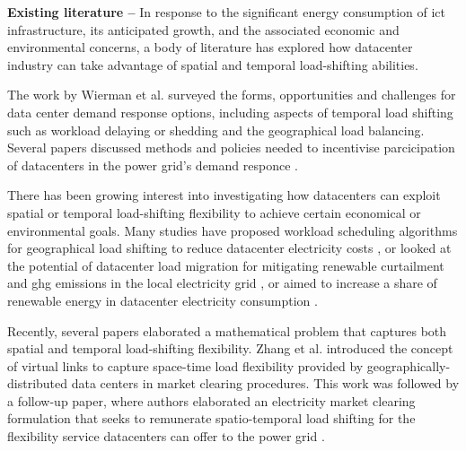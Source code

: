 \textbf{Existing literature --} In response to the significant energy consumption of \gls{ict} infrastructure, its anticipated growth, and the associated economic and environmental concerns, a body of literature has explored how datacenter industry can take advantage of spatial and temporal load-shifting abilities.

The work by Wierman et al.  \cite{wiermanOpportunitiesChallengesData2014} surveyed the forms, opportunities and challenges for data center demand response options, including aspects of temporal load shifting such as workload delaying or shedding and the geographical load balancing. Several papers discussed methods and policies needed to incentivise parcicipation of datacenters in the power grid's demand responce \cite{liuPricingDataCenter2014, zhouTruthfulEfficientIncentive2020}.

There has been growing interest into investigating how datacenters can exploit spatial or temporal load-shifting flexibility to achieve certain economical or environmental goals. Many studies have proposed workload scheduling algorithms for geographical load shifting to reduce datacenter electricity costs \cite{velascoElasticOperationsFederated2014, douCarbonAwareElectricityCost2017, heMinimizingOperationCost2021, raoDistributedCoordinationInternet2012, renCarbonAwareEnergyCapacity2012, dengEcoAwareOnlinePower2016}, or looked at the potential of datacenter load migration for mitigating renewable curtailment and \gls{ghg} emissions in the local electricity grid \cite{zhengMitigatingCurtailmentCarbon2020, mahmudDistributedFrameworkCarbon2016}, or aimed to increase a share of renewable energy in datacenter electricity consumption \cite{wangGreenawareVirtualMachine2015, kimDataCentersDispatchable2017, liuGeographicalLoadBalancing2011, kellyBalancingPowerSystems2016}.

Recently, several papers elaborated a mathematical problem that captures both spatial and temporal load-shifting flexibility. Zhang et al. \cite{zhangFlexibilityNetworksData2020} introduced the concept of virtual links to capture space-time load flexibility provided by geographically-distributed data centers in market clearing procedures. This work was followed by a follow-up paper, where authors elaborated an electricity market clearing formulation that seeks to remunerate spatio-temporal load shifting for the flexibility service datacenters can offer to the power grid \cite{zhangRemuneratingSpaceTime2022}.


